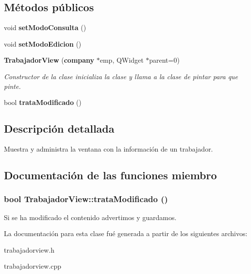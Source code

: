 \subsection*{M\'{e}todos p\'{u}blicos}
\begin{CompactItemize}
\item 
void {\bf set\-Modo\-Consulta} ()\label{classTrabajadorView_a0}

\item 
void {\bf set\-Modo\-Edicion} ()\label{classTrabajadorView_a1}

\item 
{\bf Trabajador\-View} ({\bf company} $\ast$emp, QWidget $\ast$parent=0)\label{classTrabajadorView_a2}

\begin{CompactList}\small\item\em Constructor de la clase inicializa la clase y llama a la clase de pintar para que pinte. \item\end{CompactList}\item 
bool {\bf trata\-Modificado} ()
\end{CompactItemize}


\subsection{Descripci\'{o}n detallada}
Muestra y administra la ventana con la informaci\'{o}n de un trabajador. 



\subsection{Documentaci\'{o}n de las funciones miembro}
\subsubsection{\setlength{\rightskip}{0pt plus 5cm}bool Trabajador\-View::trata\-Modificado ()}\label{classTrabajadorView_a3}


Si se ha modificado el contenido advertimos y guardamos. 

La documentaci\'{o}n para esta clase fu\'{e} generada a partir de los siguientes archivos:\begin{CompactItemize}
\item 
trabajadorview.h\item 
trabajadorview.cpp\end{CompactItemize}
